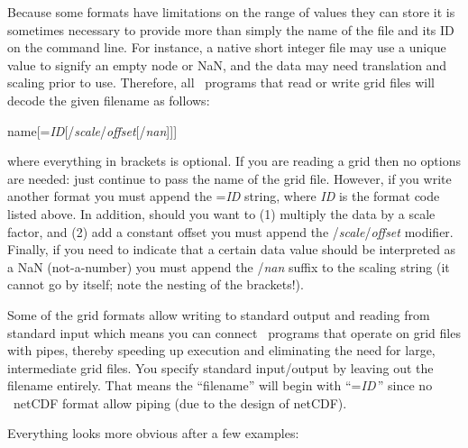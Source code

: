 Because some formats have limitations on the range of values they can store
it is sometimes necessary to provide more
than simply the name of the file and its ID on the command line.  For instance,
a native short integer file may use a unique value to signify an empty node
or NaN, and the data may need translation and scaling prior to use.
Therefore, all \GMT\ programs that read or write grid files will decode
the given filename as follows:

\vspace{\baselineskip} 

\par 	name[=\emph{ID}[/\emph{scale}/\emph{offset}[/\emph{nan}]]]\par 

\vspace{\baselineskip} 

\noindent
where everything in brackets is optional.  If you are reading a grid
then no options are needed: just continue to pass
the name of the grid file.  However, if you write another format you must
append the =\emph{ID} string, where \emph{ID} is the format code
listed above.  In addition, should you want to (1) multiply the data by
a scale factor, and (2) add a constant offset you must append the
/\emph{scale}/\emph{offset} modifier.  Finally, if you need to indicate
that a certain data value should be interpreted as a NaN (not-a-number)
you must append the /\emph{nan} suffix to the scaling string (it cannot
go by itself; note the nesting of the brackets!). 

Some of the grid formats allow writing to standard output and reading
from standard input which means you can connect \GMT\ programs that
operate on grid files with pipes, thereby speeding up execution and
eliminating the need for large, intermediate grid files.  You specify
standard input/output by leaving out the filename entirely.
That means the ``filename'' will begin with
``=\emph{ID}\,'' since no \GMT\  netCDF format 
allow piping (due to the design of netCDF). 

Everything looks more obvious after a few examples: 

